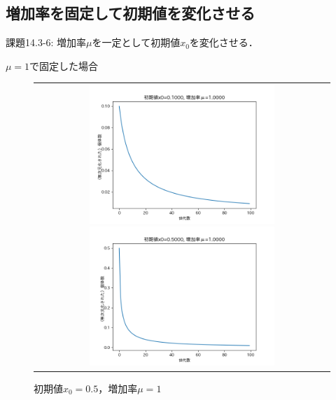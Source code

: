 \documentclass[a4paper, oneside]{jsarticle}
\begin{document}
\newpage
\subsection{増加率を固定して初期値を変化させる}

課題14.3-6: 増加率$\mu$を一定として初期値$x_0$を変化させる．

$\mu=1$で固定した場合
\begin{figure}[H]
  \begin{tabular}{c}
    \begin{minipage}{0.50\hsize}
      \centering
      \includegraphics[width=70mm]
        {x0_0.1000-mu_1.0000.png}
        \caption{初期値$x_0=0.1$，増加率$\mu=1$}
        \label{fig:0.1000_1.0000}
    \end{minipage}
    \begin{minipage}{0.50\hsize}
      \centering
      \includegraphics[width=70mm]
        {x0_0.5000-mu_1.0000.png}
        \caption{初期値$x_0=0.5$，増加率$\mu=1$}
        \label{fig:0.5000_1.0000}
    \end{minipage}
  \end{tabular}
\end{figure}
\end{document}
